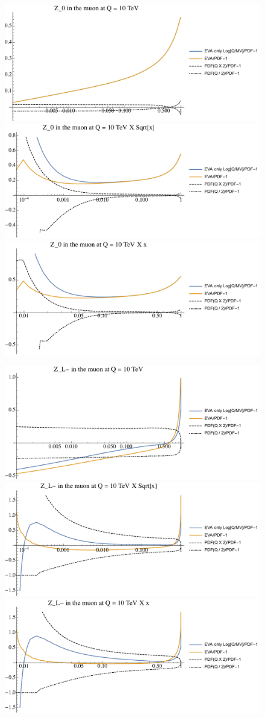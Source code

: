 \documentclass[a4paper,11pt]{article}
\begin{document}
\begin{figure}[ht]
\includegraphics[width=0.46\linewidth]{PlotPDFs/ratios/10TeV/Z_0_Q.pdf}
\includegraphics[width=0.46\linewidth]{PlotPDFs/ratios/10TeV/Z_0_Qsqrtx.pdf}
\includegraphics[width=0.46\linewidth]{PlotPDFs/ratios/10TeV/Z_0_Qx.pdf}
\end{figure}

\begin{figure}[ht]
\includegraphics[width=0.46\linewidth]{PlotPDFs/ratios/10TeV/Z_L-_Q.pdf}
\includegraphics[width=0.46\linewidth]{PlotPDFs/ratios/10TeV/Z_L-_Qsqrtx.pdf}
\includegraphics[width=0.46\linewidth]{PlotPDFs/ratios/10TeV/Z_L-_Qx.pdf}
\end{figure}
\end{document}
